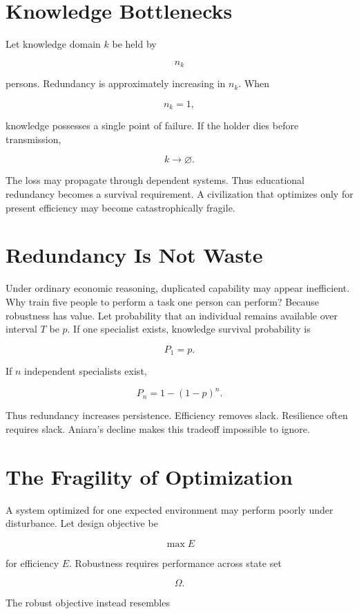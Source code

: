 \documentclass[11pt,oneside]{book}
\theoremstyle{definition}
\theoremstyle{remark}
\begin{document}
\section{Knowledge Bottlenecks}

Let knowledge domain \(k\) be held by

\[
n_k
\]

persons. Redundancy is approximately increasing in \(n_k\). When

\[
n_k=1,
\]

knowledge possesses a single point of failure. If the holder dies before transmission,

\[
k\rightarrow\varnothing.
\]

The loss may propagate through dependent systems. Thus educational redundancy becomes a survival
requirement. A civilization that optimizes only for present efficiency may become catastrophically
fragile.

\section{Redundancy Is Not Waste}

Under ordinary economic reasoning, duplicated capability may appear inefficient. Why train five
people to perform a task one person can perform? Because robustness has value. Let probability that
an individual remains available over interval \(T\) be \(p\). If one specialist exists, knowledge
survival probability is

\[
P_1=p.
\]

If \(n\) independent specialists exist,

\[
P_n = 1-(1-p)^n.
\]

Thus redundancy increases persistence. Efficiency removes slack. Resilience often requires slack.
Aniara's decline makes this tradeoff impossible to ignore.

\section{The Fragility of Optimization}

A system optimized for one expected environment may perform poorly under disturbance. Let design
objective be

\[
\max E
\]

for efficiency \(E\). Robustness requires performance across state set

\[
\Omega.
\]

The robust objective instead resembles
\end{document}
